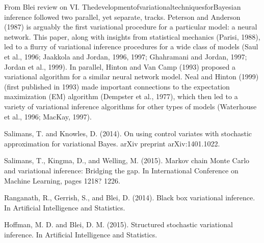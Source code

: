 \documentclass{article}
\begin{document}
From Blei review on VI.
ThedevelopmentofvariationaltechniquesforBayesian inference followed two parallel, yet separate, tracks. Peterson and Anderson (1987) is arguably the first variational procedure for a particular model: a neural network. This paper, along with insights from statistical mechanics (Parisi, 1988), led to a flurry of variational inference procedures for a wide class of models (Saul et al., 1996; Jaakkola and Jordan, 1996, 1997; Ghahramani and Jordan, 1997; Jordan et al., 1999). In parallel, Hinton and Van Camp (1993) proposed a variational algorithm for a similar neural network model. Neal and Hinton (1999) (first published in 1993) made important connections to the expectation maximization (EM) algorithm (Dempster et al., 1977), which then led to a variety of variational inference algorithms for other types of models (Waterhouse et al., 1996; MacKay, 1997).

Salimans, T. and Knowles, D. (2014). On using control variates with stochastic approximation for variational Bayes. arXiv preprint arXiv:1401.1022.

Salimans, T., Kingma, D., and Welling, M. (2015). Markov chain Monte Carlo and variational inference: Bridging the gap. In International Conference on Machine Learning, pages 1218? 1226.

Ranganath, R., Gerrish, S., and Blei, D. (2014). Black box variational inference. In Artificial
Intelligence and Statistics.

Hoffman, M. D. and Blei, D. M. (2015). Structured stochastic variational inference. In Artificial Intelligence and Statistics.
\end{document}
